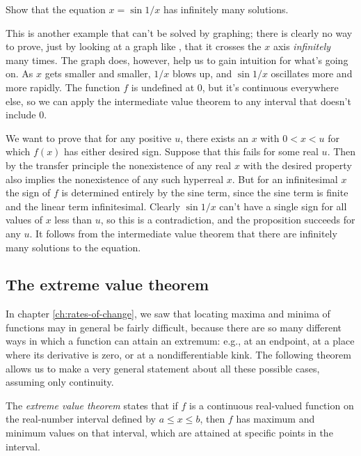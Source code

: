 \begin{eg}\label{eg:x-minus-sin-1-over-x}
\egquestion Show that the equation $x=\sin 1/x$ has infinitely many solutions.

\eganswer  This is another example that can't be solved by graphing; there is
clearly no way to prove, just by looking at a graph like , that it crosses the
$x$ axis \emph{infinitely} many times. The graph does, however, help us to gain intuition for what's
going on. As $x$ gets smaller and smaller, $1/x$ blows up, and $\sin 1/x$ oscillates more and more
rapidly. The function $f$ is undefined at 0, but it's continuous everywhere else, so we can apply the
intermediate value theorem to any interval that doesn't include 0.

We want to prove that for any positive $u$, there exists an $x$ with $0<x<u$ for which $f(x)$ has
either desired sign. Suppose that this fails for some real $u$. Then by the transfer principle the nonexistence
of any real $x$ with the desired property also implies the nonexistence of any such hyperreal $x$.
But for an infinitesimal $x$ the sign of $f$ is determined entirely by the sine term, since the sine
term is finite and the linear term infinitesimal. Clearly $\sin 1/x$ can't have a single sign for
all values of $x$ less than $u$, so this is a contradiction, and the proposition succeeds for any $u$.
It follows from the intermediate value theorem that there are infinitely many solutions to the equation.
\end{eg}


\subsection{The extreme value theorem}

In chapter \ref{ch:rates-of-change}, we saw that locating maxima and minima of functions may in general
be fairly difficult, because there are so many different ways in which a function can attain an extremum:
e.g., at an endpoint, at a place where its derivative is zero, or at a nondifferentiable kink. The following
theorem allows us to make a very general statement about all these possible cases, assuming only continuity.

The \emph{extreme value theorem}\label{extreme-value-theorem}
states that if $f$ is a continuous real-valued function on the real-number
interval defined by $a \le x \le b$, then $f$ has maximum and minimum values on that interval, which are
attained at specific points in the interval.

